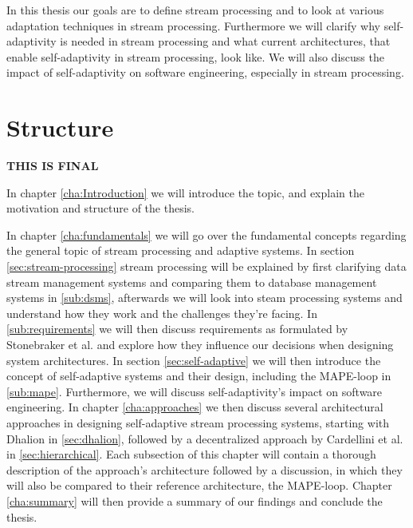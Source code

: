 \quad In this thesis our goals are to define stream processing and to look at various adaptation techniques in stream processing. Furthermore we will clarify why
self-adaptivity is needed in stream processing and what current architectures, that enable self-adaptivity in stream processing, look like.
We will also discuss the impact of self-adaptivity on software engineering, especially in stream processing.


\section{Structure}
\label{sec:structure}
\textbf{\color{green}THIS IS FINAL}

In chapter \ref{cha:Introduction} we will introduce the topic, and explain the motivation and structure of the thesis.

In chapter \ref{cha:fundamentals} we will go over the fundamental concepts regarding the general topic of stream processing and adaptive systems.
In section \ref{sec:stream-processing} stream processing will be explained by first clarifying data stream management systems and comparing them to database management systems 
in \ref{sub:dsms}, afterwards we will look into steam processing systems and understand how they work and the challenges they're facing.
In \ref{sub:requirements} we will then discuss requirements as formulated by Stonebraker et al. and explore how they influence our decisions when designing system architectures.
In section \ref{sec:self-adaptive} we will then introduce the concept of self-adaptive systems and their design, including the MAPE-loop in \ref{sub:mape}. 
Furthermore, we will discuss self-adaptivity's impact on software engineering.
In chapter \ref{cha:approaches} we then discuss several architectural approaches in designing self-adaptive stream processing systems, starting with Dhalion in \ref{sec:dhalion}, 
followed by a decentralized approach by Cardellini et al. in \ref{sec:hierarchical}.
Each subsection of this chapter will contain a thorough description of the approach's architecture followed by a discussion, 
in which they will also be compared to their reference architecture, the MAPE-loop.
Chapter \ref{cha:summary} will then provide a summary of our findings and conclude the thesis.